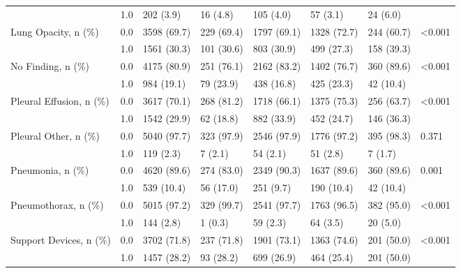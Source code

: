\begin{tabular}{llllllll}
                       & 1.0 &            202 (3.9) &    16 (4.8) &    105 (4.0) &     57 (3.1) &    24 (6.0) &         \\
Lung Opacity, n (\%) & 0.0 &          3598 (69.7) &  229 (69.4) &  1797 (69.1) &  1328 (72.7) &  244 (60.7) &  <0.001 \\
                       & 1.0 &          1561 (30.3) &  101 (30.6) &   803 (30.9) &   499 (27.3) &  158 (39.3) &         \\
No Finding, n (\%) & 0.0 &          4175 (80.9) &  251 (76.1) &  2162 (83.2) &  1402 (76.7) &  360 (89.6) &  <0.001 \\
                       & 1.0 &           984 (19.1) &   79 (23.9) &   438 (16.8) &   425 (23.3) &   42 (10.4) &         \\
Pleural Effusion, n (\%) & 0.0 &          3617 (70.1) &  268 (81.2) &  1718 (66.1) &  1375 (75.3) &  256 (63.7) &  <0.001 \\
                       & 1.0 &          1542 (29.9) &   62 (18.8) &   882 (33.9) &   452 (24.7) &  146 (36.3) &         \\
Pleural Other, n (\%) & 0.0 &          5040 (97.7) &  323 (97.9) &  2546 (97.9) &  1776 (97.2) &  395 (98.3) &   0.371 \\
                       & 1.0 &            119 (2.3) &     7 (2.1) &     54 (2.1) &     51 (2.8) &     7 (1.7) &         \\
Pneumonia, n (\%) & 0.0 &          4620 (89.6) &  274 (83.0) &  2349 (90.3) &  1637 (89.6) &  360 (89.6) &   0.001 \\
                       & 1.0 &           539 (10.4) &   56 (17.0) &    251 (9.7) &   190 (10.4) &   42 (10.4) &         \\
Pneumothorax, n (\%) & 0.0 &          5015 (97.2) &  329 (99.7) &  2541 (97.7) &  1763 (96.5) &  382 (95.0) &  <0.001 \\
                       & 1.0 &            144 (2.8) &     1 (0.3) &     59 (2.3) &     64 (3.5) &    20 (5.0) &         \\
Support Devices, n (\%) & 0.0 &          3702 (71.8) &  237 (71.8) &  1901 (73.1) &  1363 (74.6) &  201 (50.0) &  <0.001 \\
                       & 1.0 &          1457 (28.2) &   93 (28.2) &   699 (26.9) &   464 (25.4) &  201 (50.0) &         \\
\bottomrule
\end{tabular}
